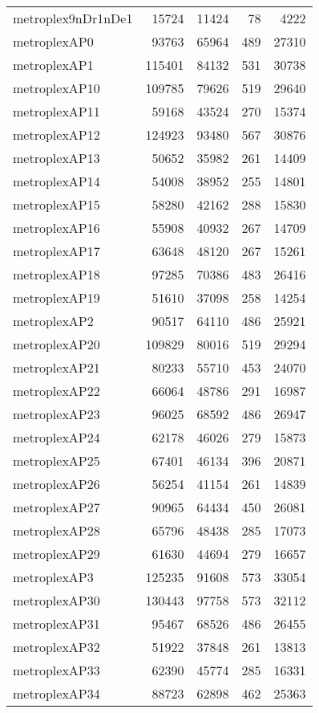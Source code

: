 \begin{tabular}{lrrrr}
metroplex9nDr1nDe1 & 15724 & 11424 & 78 & 4222 \\
metroplexAP0 & 93763 & 65964 & 489 & 27310 \\
metroplexAP1 & 115401 & 84132 & 531 & 30738 \\
metroplexAP10 & 109785 & 79626 & 519 & 29640 \\
metroplexAP11 & 59168 & 43524 & 270 & 15374 \\
metroplexAP12 & 124923 & 93480 & 567 & 30876 \\
metroplexAP13 & 50652 & 35982 & 261 & 14409 \\
metroplexAP14 & 54008 & 38952 & 255 & 14801 \\
metroplexAP15 & 58280 & 42162 & 288 & 15830 \\
metroplexAP16 & 55908 & 40932 & 267 & 14709 \\
metroplexAP17 & 63648 & 48120 & 267 & 15261 \\
metroplexAP18 & 97285 & 70386 & 483 & 26416 \\
metroplexAP19 & 51610 & 37098 & 258 & 14254 \\
metroplexAP2 & 90517 & 64110 & 486 & 25921 \\
metroplexAP20 & 109829 & 80016 & 519 & 29294 \\
metroplexAP21 & 80233 & 55710 & 453 & 24070 \\
metroplexAP22 & 66064 & 48786 & 291 & 16987 \\
metroplexAP23 & 96025 & 68592 & 486 & 26947 \\
metroplexAP24 & 62178 & 46026 & 279 & 15873 \\
metroplexAP25 & 67401 & 46134 & 396 & 20871 \\
metroplexAP26 & 56254 & 41154 & 261 & 14839 \\
metroplexAP27 & 90965 & 64434 & 450 & 26081 \\
metroplexAP28 & 65796 & 48438 & 285 & 17073 \\
metroplexAP29 & 61630 & 44694 & 279 & 16657 \\
metroplexAP3 & 125235 & 91608 & 573 & 33054 \\
metroplexAP30 & 130443 & 97758 & 573 & 32112 \\
metroplexAP31 & 95467 & 68526 & 486 & 26455 \\
metroplexAP32 & 51922 & 37848 & 261 & 13813 \\
metroplexAP33 & 62390 & 45774 & 285 & 16331 \\
metroplexAP34 & 88723 & 62898 & 462 & 25363 \\

\end{tabular}
